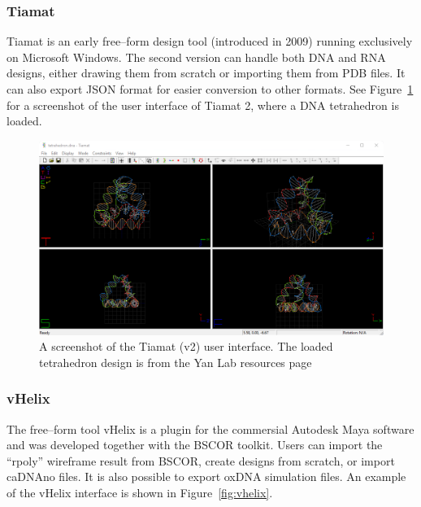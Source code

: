 \subsubsection{Tiamat}
\label{sec:tiamat}
Tiamat is an early free--form design tool (introduced in 2009) \cite{Tiamat} running exclusively on Microsoft Windows. The second version can handle both DNA and RNA designs, either drawing them from scratch or importing them from PDB files. It can also export JSON format for easier conversion to other formats. See Figure~\ref{fig:tiamat} for a screenshot of the user interface of Tiamat 2, where a DNA tetrahedron is loaded.

\begin{figure}[ht]
  \begin{center}
    \includegraphics[width=\textwidth]{figures/tiamat_ui.png}
    \caption{A screenshot of the Tiamat \cite{Tiamat} (v2) user interface. The loaded tetrahedron design is from the Yan Lab resources page \cite{tiamatWeb}}
    \label{fig:tiamat}
  \end{center}
\end{figure}

\subsubsection{vHelix}
\label{sec:vhelix}
The free--form tool vHelix \cite{vHelix} is a plugin for the commersial Autodesk Maya software and was developed together with the BSCOR toolkit. Users can import the ``rpoly'' wireframe result from BSCOR, create designs from scratch, or import caDNAno files. It is also possible to export oxDNA simulation files. An example of the vHelix interface is shown in Figure~\ref{fig:vhelix}. 

